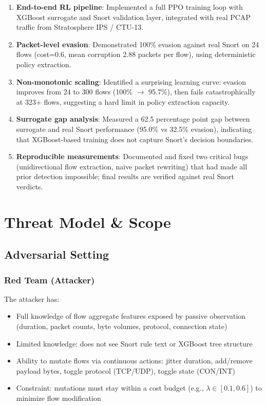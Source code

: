 \documentclass[12pt,a4paper]{report}
\begin{document}
\begin{enumerate}
  \item \textbf{End-to-end RL pipeline}: Implemented a full PPO training loop with XGBoost surrogate and Snort validation layer, integrated with real PCAP traffic from Stratosphere IPS / CTU-13.
  
  \item \textbf{Packet-level evasion}: Demonstrated 100\% evasion against real Snort on 24 flows (cost=0.6, mean corruption 2.88 packets per flow), using deterministic policy extraction.
  
  \item \textbf{Non-monotonic scaling}: Identified a surprising learning curve: evasion improves from 24 to 300 flows (100\% $\to$ 95.7\%), then fails catastrophically at 323+ flows, suggesting a hard limit in policy extraction capacity.
  
  \item \textbf{Surrogate gap analysis}: Measured a 62.5 percentage point gap between surrogate and real Snort performance (95.0\% vs 32.5\% evasion), indicating that XGBoost-based training does not capture Snort's decision boundaries.
  
  \item \textbf{Reproducible measurements}: Documented and fixed two critical bugs (unidirectional flow extraction, naive packet rewriting) that had made all prior detection impossible; final results are verified against real Snort verdicts.
\end{enumerate}

\chapter{Threat Model \& Scope}

\section{Adversarial Setting}

\subsection{Red Team (Attacker)}
The attacker has:
\begin{itemize}
  \item Full knowledge of flow aggregate features exposed by passive observation (duration, packet counts, byte volumes, protocol, connection state)
  \item Limited knowledge: does not see Snort rule text or XGBoost tree structure
  \item Ability to mutate flows via continuous actions: jitter duration, add/remove payload bytes, toggle protocol (TCP/UDP), toggle state (CON/INT)
  \item Constraint: mutations must stay within a cost budget (e.g., $\lambda \in [0.1, 0.6]$) to minimize flow modification
\end{itemize}
\end{document}
